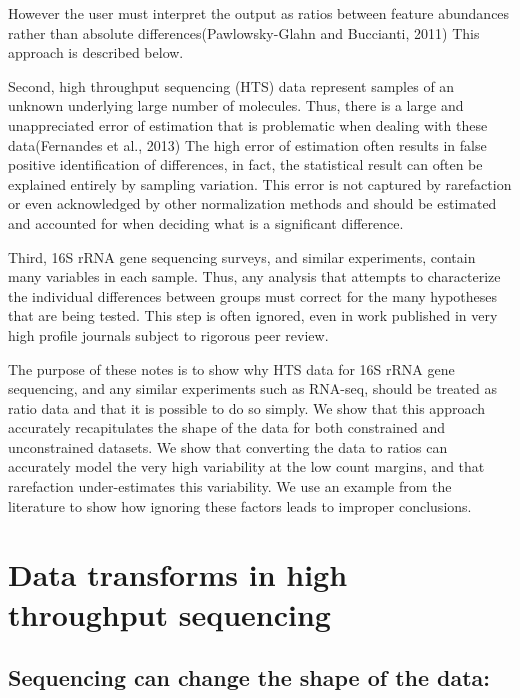\documentclass[twocolumn]{article}
\begin{document}
However the user must interpret the output as ratios between feature
abundances rather than absolute differences(Pawlowsky-Glahn and
Buccianti, 2011) This approach is described below.

Second, high throughput sequencing (HTS) data represent samples of an
unknown underlying large number of molecules. Thus, there is a large and
unappreciated error of estimation that is problematic when dealing with
these data(Fernandes et al., 2013) The high error of estimation often
results in false positive identification of differences, in fact, the
statistical result can often be explained entirely by sampling
variation. This error is not captured by rarefaction or even
acknowledged by other normalization methods and should be estimated and
accounted for when deciding what is a significant difference.

Third, 16S rRNA gene sequencing surveys, and similar experiments,
contain many variables in each sample. Thus, any analysis that attempts
to characterize the individual differences between groups must correct
for the many hypotheses that are being tested. This step is often
ignored, even in work published in very high profile journals subject to
rigorous peer review.

The purpose of these notes is to show why HTS data for 16S rRNA gene
sequencing, and any similar experiments such as RNA-seq, should be
treated as ratio data and that it is possible to do so simply. We show
that this approach accurately recapitulates the shape of the data for
both constrained and unconstrained datasets. We show that converting the
data to ratios can accurately model the very high variability at the low
count margins, and that rarefaction under-estimates this variability. We
use an example from the literature to show how ignoring these factors
leads to improper conclusions. \clearpage

\section{Data transforms in high throughput
sequencing}\label{data-transforms-in-high-throughput-sequencing}

\subsection{Sequencing can change the shape of the
data:}\label{sequencing-can-change-the-shape-of-the-data}
\end{document}
